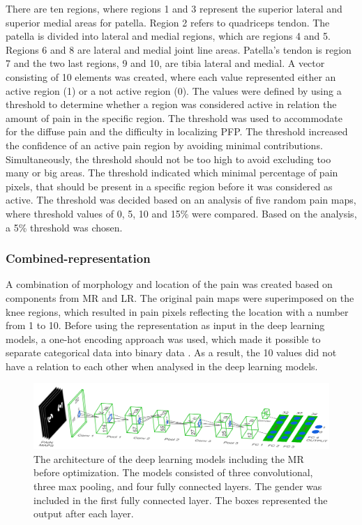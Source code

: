 \noindent 
There are ten regions, where regions 1 and 3 represent the superior lateral and superior medial areas for patella. Region 2 refers to quadriceps tendon. The patella is divided into lateral and medial regions, which are regions 4 and 5. Regions 6 and 8 are lateral and medial joint line areas. Patella's tendon is region 7 and the two last regions, 9 and 10, are tibia lateral and medial.\citep{Elson2010} \newline
\noindent
A vector consisting of 10 elements was created, where each value represented either an active region (1) or a not active region (0). The values were defined by using a threshold to determine whether a region was considered active in relation the amount of pain in the specific region. The threshold was used to accommodate for the diffuse pain and the difficulty in localizing PFP. The threshold increased the confidence of an active pain region by avoiding minimal contributions. Simultaneously, the threshold should not be too high to avoid excluding too many or big areas. The threshold indicated which minimal percentage of pain pixels, that should be present in a specific region before it was considered as active. The threshold was decided based on an analysis of five random pain maps, where threshold values of 0, 5, 10 and 15\% were compared. Based on the analysis, a 5\% threshold was chosen.  

\subsubsection{Combined-representation}
A combination of morphology and location of the pain was created based on components from MR and LR. The original pain maps were superimposed on the knee regions, which resulted in pain pixels reflecting the location with a number from 1 to 10. Before using the representation as input in the deep learning models, a one-hot encoding approach was used, which made it possible to separate categorical data into binary data \citep{Harris2012}. As a result, the 10 values did not have a relation to each other when analysed in the deep learning models. 


\begin{figure} [t!]
\centering
\includegraphics[width=1\textwidth]{Figures/models}
\caption{The architecture of the deep learning models including the MR before optimization. The models consisted of three convolutional, three max pooling, and four fully connected layers. The gender was included in the first fully connected layer. The boxes represented the output after each layer.}
\label{fig:models}
\end{figure}

